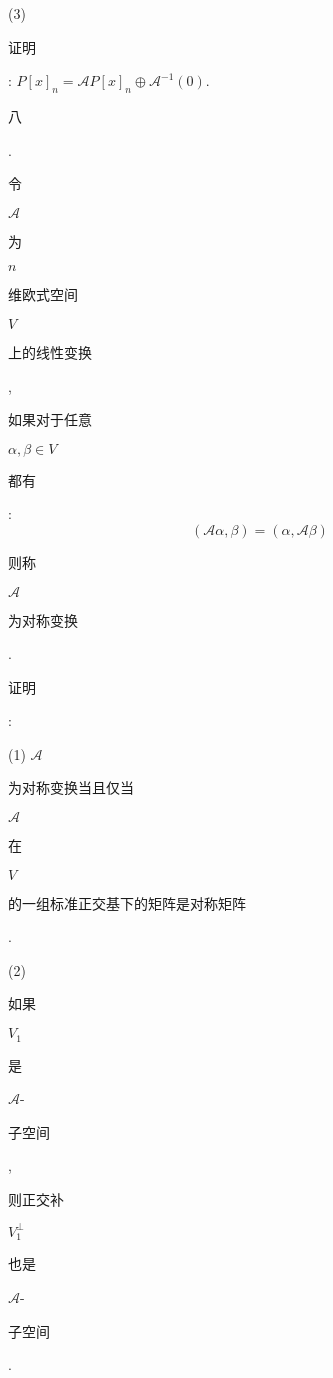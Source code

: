 \documentclass[10pt]{article}
\begin{document}
(3) \begin{CJK}{UTF8}{mj}证明\end{CJK}: $P[x]_{n}=\mathscr{A} P[x]_{n} \oplus \mathscr{A}^{-1}(0)$.

\begin{CJK}{UTF8}{mj}八\end{CJK}. \begin{CJK}{UTF8}{mj}令\end{CJK} $\mathscr{A}$ \begin{CJK}{UTF8}{mj}为\end{CJK} $n$ \begin{CJK}{UTF8}{mj}维欧式空间\end{CJK} $V$ \begin{CJK}{UTF8}{mj}上的线性变换\end{CJK}, \begin{CJK}{UTF8}{mj}如果对于任意\end{CJK} $\alpha, \beta \in V$ \begin{CJK}{UTF8}{mj}都有\end{CJK}:
$$
(\mathscr{A} \alpha, \beta)=(\alpha, \mathscr{A} \beta)
$$
\begin{CJK}{UTF8}{mj}则称\end{CJK} $\mathscr{A}$ \begin{CJK}{UTF8}{mj}为对称变换\end{CJK}. \begin{CJK}{UTF8}{mj}证明\end{CJK}:

(1) $\mathscr{A}$ \begin{CJK}{UTF8}{mj}为对称变换当且仅当\end{CJK} $\mathscr{A}$ \begin{CJK}{UTF8}{mj}在\end{CJK} $V$ \begin{CJK}{UTF8}{mj}的一组标准正交基下的矩阵是对称矩阵\end{CJK}.

(2) \begin{CJK}{UTF8}{mj}如果\end{CJK} $V_{1}$ \begin{CJK}{UTF8}{mj}是\end{CJK} $\mathscr{A}$-\begin{CJK}{UTF8}{mj}子空间\end{CJK}, \begin{CJK}{UTF8}{mj}则正交补\end{CJK} $V_{1}^{\perp}$ \begin{CJK}{UTF8}{mj}也是\end{CJK} $\mathscr{A}$-\begin{CJK}{UTF8}{mj}子空间\end{CJK}.
\end{document}
